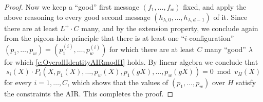 \documentclass[11pt,article,oneside]{memoir}
\theoremstyle{definition}
\theoremstyle{remark}
\begin{document}
\begin{proof}
Now we keep a ``good'' first message $(f_1,\ldots, f_w)$ fixed, and apply the above reasoning to every good second message $(h_{\lambda,0},\ldots, h_{\lambda, d-1})$ of it. 
Since there are at least $L^+\cdot C$ many, and by the extension property, we conclude again from the pigeon-hole principle that there is at least one ``$i$-configuration'' $(p_1,\ldots, p_w) = (p_1^{(i)}, \ldots,p_w^{(i)})$ for which there are at least $C$ many “good” $\lambda$ for which \eqref{e:OverallIdentityAIRmodH} holds.
By linear algebra we conclude that  
\[
s_i(X)\cdot P_i(X, p_1(X), \ldots, p_w(X), p_1(gX), \ldots, p_w(g X)) = 0 \bmod v_H(X)
\]
for every $i =1, \ldots, C$, which shows that the values of $(p_1,\ldots, p_w)$ over $H$ satisfy the constraints the AIR.
This completes the proof.
%
%

\end{proof}
\end{document}
